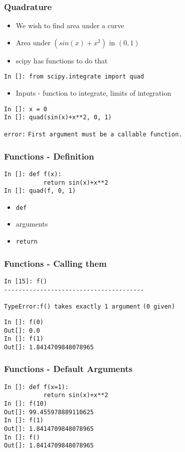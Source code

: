 \documentclass[14pt,compress]{beamer}
\newcommand{\typ}[1]{\lstinline{#1}}
\begin{document}
\begin{frame}[fragile]
\frametitle{Quadrature}
\begin{itemize}
\item We wish to find area under a curve
\item Area under $(sin(x) + x^2)$ in $(0,1)$
\item scipy has functions to do that
\end{itemize}
\small{\typ{In []: from scipy.integrate import quad}}
\begin{itemize}
\item Inputs - function to integrate, limits of integration
\end{itemize}
\begin{lstlisting}
In []: x = 0
In []: quad(sin(x)+x**2, 0, 1)
\end{lstlisting}
\alert{\typ{error:}}
\typ{First argument must be a callable function.}
\end{frame}

\begin{frame}[fragile]
\frametitle{Functions - Definition}
\begin{lstlisting}
In []: def f(x):
           return sin(x)+x**2
In []: quad(f, 0, 1)
\end{lstlisting}
\begin{itemize}
\item \typ{def}
\item arguments
\item \typ{return}
\end{itemize}
\end{frame}

\begin{frame}[fragile]
\frametitle{Functions - Calling them}
\begin{lstlisting}
In [15]: f()
---------------------------------------
\end{lstlisting}
\alert{\typ{TypeError:}}\typ{f() takes exactly 1 argument}
\typ{(0 given)}
\begin{lstlisting}
In []: f(0)
Out[]: 0.0
In []: f(1)
Out[]: 1.8414709848078965
\end{lstlisting}
\end{frame}


\begin{frame}[fragile]
\frametitle{Functions - Default Arguments}
\begin{lstlisting}
In []: def f(x=1):
           return sin(x)+x**2
In []: f(10)
Out[]: 99.455978889110625
In []: f(1)
Out[]: 1.8414709848078965
In []: f()
Out[]: 1.8414709848078965
\end{lstlisting}
\end{frame}
\end{document}
